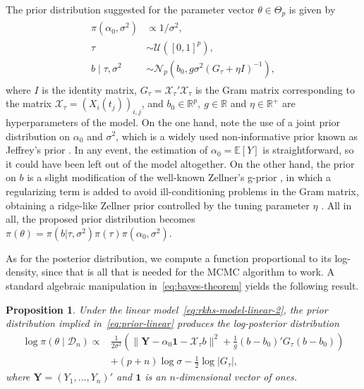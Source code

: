 \documentclass[ba]{imsart}
\numberwithin{equation}{section}
\theoremstyle{plain}
\newtheorem{proposition}{Proposition}[section]
\newcommand{\R}{\mathbb{R}}
\newcommand{\E}{\mathbb{E}}
\begin{document}
The prior distribution suggested for the parameter vector \(\theta \in \Theta_p\) is given by
\begin{align}\label{eq:prior-linear}
  \begin{split}
  \pi(\alpha_0, \sigma^2)              & \propto 1/\sigma^2,                                                     \\
  \tau                     & \sim \mathcal U([0, 1]^p),                                              \\
  b\mid \tau, \sigma^2 & \sim \mathcal N_p(b_0, g\sigma^2(G_\tau + \eta I)^{-1}),
\end{split}
\end{align}
where \(I\) is the identity matrix, \(G_\tau = \mathcal X_\tau'\mathcal X_\tau\) is the Gram matrix corresponding to the matrix \(\mathcal X_\tau = (X_i(t_j))_{i,j}\), and \(b_0\in \R^p, \ g \in \R\) and \(\eta \in \R^+\) are hyperparameters of the model. On the one hand, note the use of a joint prior distribution on \(\alpha_0\) and \(\sigma^2\), which is a widely used non-informative prior known as Jeffrey's prior \citep{jeffreys1946invariant}. In any event, the estimation of \(\alpha_0=\E[Y]\) is straightforward, so it could have been left out of the model altogether. On the other hand, the prior on \(b\) is a slight modification of the well-known Zellner's g-prior \citep{zellner1986assessing}, in which a regularizing term is added to avoid ill-conditioning problems in the Gram matrix, obtaining a ridge-like Zellner prior controlled by the tuning parameter \(\eta\) \citep{baragatti2012study}. All in all, the proposed prior distribution becomes \(\pi(\theta) = \pi(b| \tau, \sigma^2)\pi(\tau)\pi(\alpha_0, \sigma^2)\).

As for the posterior distribution, we compute a function proportional to its log-density, since that is all that is needed for the MCMC algorithm to work. A standard algebraic manipulation in~\eqref{eq:bayes-theorem} yields the following result.

\begin{proposition}
Under the linear model~\eqref{eq:rkhs-model-linear-2}, the prior distribution implied in~\eqref{eq:prior-linear} produces the log-posterior distribution
\begin{align*}
\log \pi(\theta \mid \mathcal D_n) \propto {} & \frac{1}{2\sigma^2}\left(\|\bm Y- \alpha_0\bm{1} - \mathcal X_\tau b\|^2 + \frac{1}{g}(b - b_0)'G_\tau(b - b_0) \right)\\
& + (p+n)\log\sigma - \frac{1}{2}\log |G_\tau|,
\end{align*}
where \(\bm Y=(Y_1,\dots,Y_n)'\) and \(\bm{1}\) is an \(n\)-dimensional vector of ones.
\end{proposition}
\end{document}
